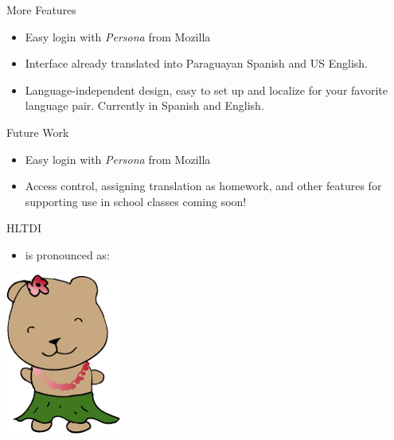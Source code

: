 \documentclass[final]{beamer}
\begin{document}
\begin{frame}{}
\begin{columns}[t]
\begin{column}{.32\linewidth}
  \begin{block}{\large More Features}
    \begin{itemize}
    \item Easy login with \emph{Persona} from Mozilla
    \item Interface already translated into Paraguayan Spanish and US English.
    \item Language-independent design, easy to set up and localize for your
    favorite language pair. Currently in Spanish and English.
    \end{itemize}
  \end{block}

  \hfill
  \begin{block}{\large Future Work}
    \begin{itemize}
    \item Easy login with \emph{Persona} from Mozilla
    \item Access control, assigning translation as homework, and other features
    for supporting use in school classes coming soon!
    \end{itemize}
  \end{block}

  \hfill
  \begin{block}{\large HLTDI}
      \begin{itemize}
      \item is pronounced as:
      \end{itemize}
  \end{block}
  \begin{center}
    \includegraphics[width=.30\linewidth]{hltdi-logo-small.png}
  \end{center}

  \end{column}
\end{columns}
\end{frame}
\end{document}
